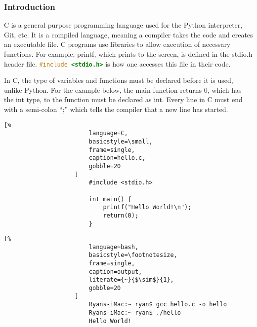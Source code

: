 \documentclass[crop=false,class=book,oneside]{standalone}
\begin{document}
            \subsubsection{Introduction}
                C is a general purpose programming language used for the
                Python interpreter, Git, etc. It is a compiled language,
                meaning a compiler takes the code and creates an
                executable file. C programs use libraries to allow
                execution of necessary functions. For example, printf,
                which prints to the screen, is defined in the stdio.h
                header file.
                \lstinline[language=C]{#include <stdio.h>}
                is how one accesses this
                file in their code.
                \par\hfill\par
                In C, the type of variables and functions must be
                declared before it is used, unlike Python. For the
                example below, the main function returns 0, which has
                the int type, to the function must be declared as int.
                Every line in C must end with a semi-colon ``;''
                which tells the compiler that a new line has started.
                \newline
                \begin{minipage}[t]{.48\textwidth}
                    \centering
                    \begin{lstlisting}[%
                        language=C,
                        basicstyle=\small,
                        frame=single,
                        caption=hello.c,
                        gobble=20
                    ]
                        #include <stdio.h>
                        
                        int main() {
                            printf("Hello World!\n");
                            return(0);
                        }
                    \end{lstlisting}
                \end{minipage}\hfill
                \begin{minipage}[t]{.48\textwidth}
                    \centering
                    \begin{lstlisting}[%
                        language=bash,
                        basicstyle=\footnotesize,
                        frame=single,
                        caption=output,
                        literate={~}{$\sim$}{1},
                        gobble=20
                    ]
                        Ryans-iMac:~ ryan$ gcc hello.c -o hello
                        Ryans-iMac:~ ryan$ ./hello
                        Hello World!
                    \end{lstlisting}
                \end{minipage}
\end{document}
